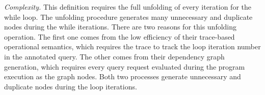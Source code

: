  \emph{Complexity.}
 This definition requires the full unfolding of every iteration for the while loop.
 The unfolding procedure generates many unnecessary and duplicate nodes during the while iterations.
 There are two reasons for this unfolding operation.
 The first one comes from the low efficiency of their trace-based operational semantics,
 which requires the trace to track the loop iteration number in the annotated query.
 The other comes from their dependency graph generation, which requires every query request evaluated during the program execution
 as the graph nodes.
 Both two processes generate unnecessary and duplicate nodes during the loop iterations.